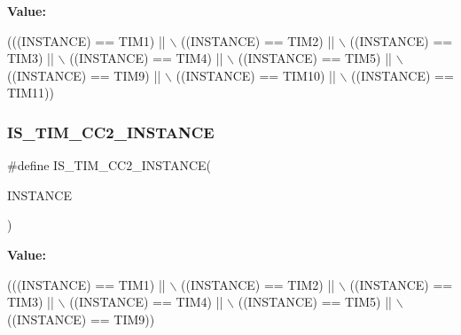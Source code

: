 {\bfseries Value\+:}
\begin{DoxyCode}
(((INSTANCE) == TIM1)  || \(\backslash\)
                                         ((INSTANCE) == TIM2)  || \(\backslash\)
                                         ((INSTANCE) == TIM3)  || \(\backslash\)
                                         ((INSTANCE) == TIM4)  || \(\backslash\)
                                         ((INSTANCE) == TIM5)  || \(\backslash\)
                                         ((INSTANCE) == TIM9)  || \(\backslash\)
                                         ((INSTANCE) == TIM10) || \(\backslash\)
                                         ((INSTANCE) == TIM11))
\end{DoxyCode}
\mbox{\label{group___exported__macros_ga6ef84d278cf917c7e420b94687b39c7c}} 
\subsubsection{\texorpdfstring{I\+S\+\_\+\+T\+I\+M\+\_\+\+C\+C2\+\_\+\+I\+N\+S\+T\+A\+N\+CE}{IS\_TIM\_CC2\_INSTANCE}}
{\footnotesize\ttfamily \#define I\+S\+\_\+\+T\+I\+M\+\_\+\+C\+C2\+\_\+\+I\+N\+S\+T\+A\+N\+CE(\begin{DoxyParamCaption}\item[{}]{I\+N\+S\+T\+A\+N\+CE }\end{DoxyParamCaption})}

{\bfseries Value\+:}
\begin{DoxyCode}
(((INSTANCE) == TIM1) || \(\backslash\)
                                       ((INSTANCE) == TIM2) || \(\backslash\)
                                       ((INSTANCE) == TIM3) || \(\backslash\)
                                       ((INSTANCE) == TIM4) || \(\backslash\)
                                       ((INSTANCE) == TIM5) || \(\backslash\)
                                       ((INSTANCE) == TIM9))
\end{DoxyCode}
\mbox{\label{group___exported__macros_ga0c37cb8f925fd43622cce7a4c00fd95e}} 
